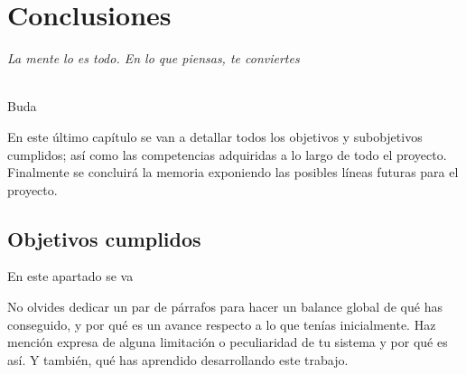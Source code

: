 \chapter{Conclusiones}
\label{cap:capitulo8}

\begin{flushright}
\begin{minipage}[]{10cm}
\emph{La mente lo es todo. En lo que piensas, te conviertes}\\
\end{minipage}\\

Buda\\
\end{flushright}

\vspace{1cm}

En este último capítulo se van a detallar todos los objetivos y subobjetivos cumplidos; así como las competencias adquiridas a lo largo de todo el proyecto. Finalmente se concluirá la memoria exponiendo las posibles líneas futuras para el proyecto.


\section{Objetivos cumplidos}

En este apartado se va




No olvides dedicar un par de párrafos para hacer un balance global de qué has conseguido, y por qué es un avance respecto a lo que tenías inicialmente. Haz mención expresa de alguna limitación o peculiaridad de tu sistema y por qué es así. Y también, qué has aprendido desarrollando este trabajo.\\



